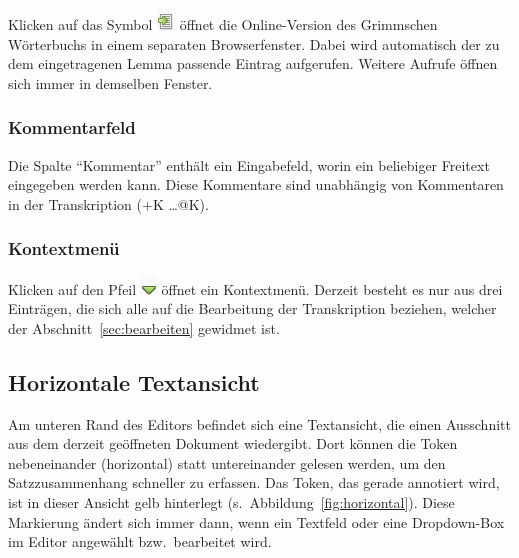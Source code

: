 \documentclass[11pt,a4paper,parskip=half]{scrartcl}
\begin{document}
Klicken auf das
Symbol \includegraphics[height=\baselineskip]{img/lemma-link2.png}
öffnet die Online-Version des Grimmschen Wörterbuchs in einem
separaten Browserfenster.  Dabei wird automatisch der zu dem
eingetragenen Lemma passende Eintrag aufgerufen.  Weitere Aufrufe
öffnen sich immer in demselben Fenster.

\subsubsection{Kommentarfeld}

Die Spalte "`Kommentar"' enthält ein Eingabefeld, worin ein beliebiger
Freitext eingegeben werden kann.  Diese Kommentare sind unabhängig von
Kommentaren in der Transkription (+K \ldots{}@K).

\subsubsection{Kontextmenü}

\vspace{-.5em} Klicken auf den
Pfeil \includegraphics[height=\baselineskip]{img/dropdown.png} öffnet
ein Kontextmenü.  Derzeit besteht es nur aus drei Einträgen, die sich
alle auf die Bearbeitung der Transkription beziehen, welcher der
Abschnitt~\ref{sec:bearbeiten} gewidmet ist.

\subsection{Horizontale Textansicht}
\label{sec:horizontal}

Am unteren Rand des Editors befindet sich eine Textansicht, die einen
Ausschnitt aus dem derzeit geöffneten Dokument wiedergibt.  Dort
können die Token nebeneinander (horizontal) statt untereinander
gelesen werden, um den Satzzusammenhang schneller zu erfassen.  Das
Token, das gerade annotiert wird, ist in dieser Ansicht gelb
hinterlegt (s.\ Abbildung~\ref{fig:horizontal}).  Diese Markierung
ändert sich immer dann, wenn ein Textfeld oder eine Dropdown-Box im
Editor angewählt bzw.\ bearbeitet wird.
\end{document}
